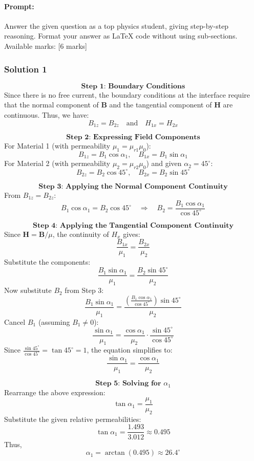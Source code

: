 \documentclass{article}
\begin{document}
\paragraph{Prompt: \\} 
Answer the given question as a top physics student, giving step-by-step reasoning. Format your answer as LaTeX code without using sub-sections. Available marks: [6 marks]

\subsubsection{Solution 1}
\[
\textbf{Step 1: Boundary Conditions}
\]
Since there is no free current, the boundary conditions at the interface require that the normal component of \(\mathbf{B}\) and the tangential component of \(\mathbf{H}\) are continuous. Thus, we have:
\[
B_{1z} = B_{2z} \quad \text{and} \quad H_{1x} = H_{2x}
\]

\[
\textbf{Step 2: Expressing Field Components}
\]
For Material 1 (with permeability \(\mu_1 = \mu_{r1}\mu_0\)):
\[
B_{1z} = B_1 \cos \alpha_1, \quad B_{1x} = B_1 \sin \alpha_1
\]
For Material 2 (with permeability \(\mu_2 = \mu_{r2}\mu_0\)) and given \(\alpha_2 = 45^\circ\):
\[
B_{2z} = B_2 \cos 45^\circ, \quad B_{2x} = B_2 \sin 45^\circ
\]

\[
\textbf{Step 3: Applying the Normal Component Continuity}
\]
From \(B_{1z} = B_{2z}\):
\[
B_1 \cos \alpha_1 = B_2 \cos 45^\circ \quad \Longrightarrow \quad B_2 = \frac{B_1 \cos \alpha_1}{\cos 45^\circ}
\]

\[
\textbf{Step 4: Applying the Tangential Component Continuity}
\]
Since \(\mathbf{H} = \mathbf{B}/\mu\), the continuity of \(H_{x}\) gives:
\[
\frac{B_{1x}}{\mu_1} = \frac{B_{2x}}{\mu_2}
\]
Substitute the components:
\[
\frac{B_1 \sin \alpha_1}{\mu_1} = \frac{B_2 \sin 45^\circ}{\mu_2}
\]
Now substitute \(B_2\) from Step 3:
\[
\frac{B_1 \sin \alpha_1}{\mu_1} = \frac{\left(\frac{B_1 \cos \alpha_1}{\cos 45^\circ}\right) \sin 45^\circ}{\mu_2}
\]
Cancel \(B_1\) (assuming \(B_1 \neq 0\)):
\[
\frac{\sin \alpha_1}{\mu_1} = \frac{\cos \alpha_1}{\mu_2} \cdot \frac{\sin 45^\circ}{\cos 45^\circ}
\]
Since \(\frac{\sin 45^\circ}{\cos 45^\circ} = \tan 45^\circ = 1\), the equation simplifies to:
\[
\frac{\sin \alpha_1}{\mu_1} = \frac{\cos \alpha_1}{\mu_2}
\]

\[
\textbf{Step 5: Solving for \(\alpha_1\)}
\]
Rearrange the above expression:
\[
\tan \alpha_1 = \frac{\mu_1}{\mu_2}
\]
Substitute the given relative permeabilities:
\[
\tan \alpha_1 = \frac{1.493}{3.012} \approx 0.495
\]
Thus,
\[
\alpha_1 = \arctan(0.495) \approx 26.4^\circ
\]
\end{document}
